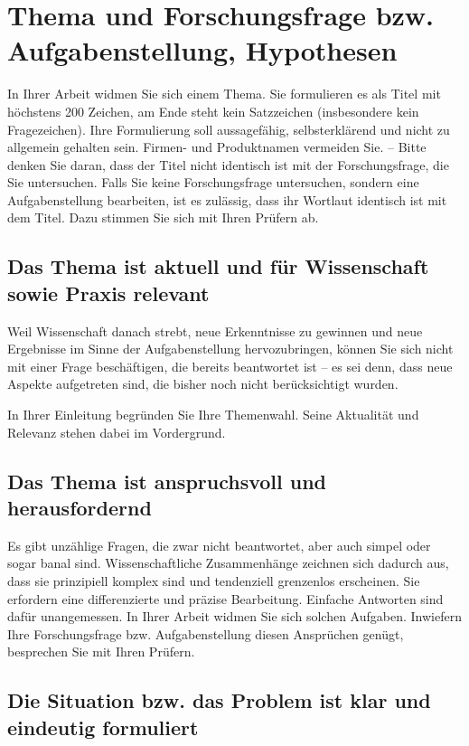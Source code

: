 \chapter{Thema und Forschungsfrage bzw. Aufgabenstellung, Hypothesen}
\label{chap:thema-forschungsfrage}

In Ihrer Arbeit widmen Sie sich einem Thema. Sie formulieren es als Titel mit höchstens 200 Zeichen, am Ende steht kein Satzzeichen (insbesondere kein Fragezeichen). Ihre Formulierung soll aussagefähig, selbsterklärend und nicht zu allgemein gehalten sein. Firmen- und Produktnamen vermeiden Sie. – Bitte denken Sie daran, dass der Titel nicht identisch ist mit der Forschungsfrage, die Sie untersuchen. Falls Sie keine Forschungsfrage untersuchen, sondern eine Aufgabenstellung bearbeiten, ist es zulässig, dass ihr Wortlaut identisch ist mit dem Titel. Dazu stimmen Sie sich mit Ihren Prüfern ab.

\section{Das Thema ist aktuell und für Wissenschaft sowie Praxis relevant}
\label{sec:thema-aktuell-relevant}

Weil Wissenschaft danach strebt, neue Erkenntnisse zu gewinnen und neue Ergebnisse im Sinne der Aufgabenstellung hervozubringen, können Sie sich nicht mit einer Frage beschäftigen, die bereits beantwortet ist – es sei denn, dass neue Aspekte aufgetreten sind, die bisher noch nicht berücksichtigt wurden.

In Ihrer Einleitung begründen Sie Ihre Themenwahl. Seine Aktualität und Relevanz stehen dabei im Vordergrund.

\section{Das Thema ist anspruchsvoll und herausfordernd}
\label{sec:thema-anspruchsvoll}

Es gibt unzählige Fragen, die zwar nicht beantwortet, aber auch simpel oder sogar banal sind. Wissenschaftliche Zusammenhänge zeichnen sich dadurch aus, dass sie prinzipiell komplex sind und tendenziell grenzenlos erscheinen. Sie erfordern eine differenzierte und präzise Bearbeitung. Einfache Antworten sind dafür unangemessen. In Ihrer Arbeit widmen Sie sich solchen Aufgaben. Inwiefern Ihre Forschungsfrage bzw. Aufgabenstellung diesen Ansprüchen genügt, besprechen Sie mit Ihren Prüfern.

\section{Die Situation bzw. das Problem ist klar und eindeutig formuliert}
\label{sec:problem-klar-formuliert}

